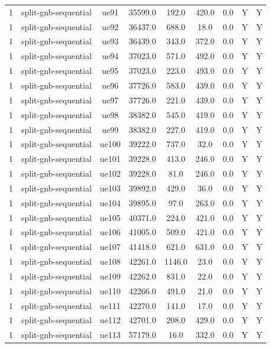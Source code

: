 \begin{table}[ht]
\begin{tabular}{|c|c|c|c|c|c|c|c|c|}
1 & split-gnb-sequential & ue91 & 35599.0 & 192.0 & 420.0 & 0.0 & Y & Y \\
1 & split-gnb-sequential & ue92 & 36437.0 & 688.0 & 18.0 & 0.0 & Y & Y \\
1 & split-gnb-sequential & ue93 & 36439.0 & 343.0 & 372.0 & 0.0 & Y & Y \\
1 & split-gnb-sequential & ue94 & 37023.0 & 571.0 & 492.0 & 0.0 & Y & Y \\
1 & split-gnb-sequential & ue95 & 37023.0 & 223.0 & 493.0 & 0.0 & Y & Y \\
1 & split-gnb-sequential & ue96 & 37726.0 & 583.0 & 439.0 & 0.0 & Y & Y \\
1 & split-gnb-sequential & ue97 & 37726.0 & 221.0 & 439.0 & 0.0 & Y & Y \\
1 & split-gnb-sequential & ue98 & 38382.0 & 545.0 & 419.0 & 0.0 & Y & Y \\
1 & split-gnb-sequential & ue99 & 38382.0 & 227.0 & 419.0 & 0.0 & Y & Y \\
1 & split-gnb-sequential & ue100 & 39222.0 & 737.0 & 32.0 & 0.0 & Y & Y \\
1 & split-gnb-sequential & ue101 & 39228.0 & 413.0 & 246.0 & 0.0 & Y & Y \\
1 & split-gnb-sequential & ue102 & 39228.0 & 81.0 & 246.0 & 0.0 & Y & Y \\
1 & split-gnb-sequential & ue103 & 39892.0 & 429.0 & 36.0 & 0.0 & Y & Y \\
1 & split-gnb-sequential & ue104 & 39895.0 & 97.0 & 263.0 & 0.0 & Y & Y \\
1 & split-gnb-sequential & ue105 & 40371.0 & 224.0 & 421.0 & 0.0 & Y & Y \\
1 & split-gnb-sequential & ue106 & 41005.0 & 509.0 & 421.0 & 0.0 & Y & Y \\
1 & split-gnb-sequential & ue107 & 41418.0 & 621.0 & 631.0 & 0.0 & Y & Y \\
1 & split-gnb-sequential & ue108 & 42261.0 & 1146.0 & 23.0 & 0.0 & Y & Y \\
1 & split-gnb-sequential & ue109 & 42262.0 & 831.0 & 22.0 & 0.0 & Y & Y \\
1 & split-gnb-sequential & ue110 & 42266.0 & 491.0 & 21.0 & 0.0 & Y & Y \\
1 & split-gnb-sequential & ue111 & 42270.0 & 141.0 & 17.0 & 0.0 & Y & Y \\
1 & split-gnb-sequential & ue112 & 42701.0 & 208.0 & 429.0 & 0.0 & Y & Y \\
1 & split-gnb-sequential & ue113 & 57179.0 & 16.0 & 332.0 & 0.0 & Y & Y \\

\end{tabular}
\end{table}
